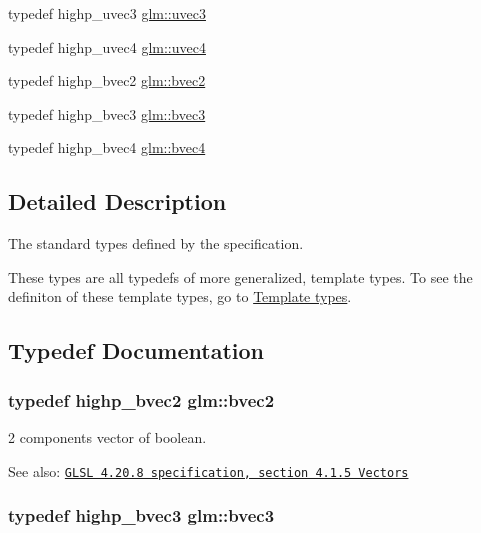 \begin{CompactItemize}
\item 
typedef highp\_\-uvec3 \hyperlink{group__core__types_gc4ba593917841b859ba1683b8b52b8fa}{glm::uvec3}
\item 
typedef highp\_\-uvec4 \hyperlink{group__core__types_g1c426d19627b32b14f0089f7f4ba7b1d}{glm::uvec4}
\item 
typedef highp\_\-bvec2 \hyperlink{group__core__types_g7523cf292181cf7daef3aa0a3267d8e3}{glm::bvec2}
\item 
typedef highp\_\-bvec3 \hyperlink{group__core__types_g3f07d6d37fc6fe875170fd5799685bcf}{glm::bvec3}
\item 
typedef highp\_\-bvec4 \hyperlink{group__core__types_g6bb211b3d3bebae3867548d5673ca5cd}{glm::bvec4}
\end{CompactItemize}


\subsection{Detailed Description}
The standard types defined by the specification. 

These types are all typedefs of more generalized, template types. To see the definiton of these template types, go to \hyperlink{group__core__template}{Template types}. 

\subsection{Typedef Documentation}
\hypertarget{group__core__types_g7523cf292181cf7daef3aa0a3267d8e3}{
\subsubsection[bvec2]{\setlength{\rightskip}{0pt plus 5cm}typedef highp\_\-bvec2 {\bf glm::bvec2}}}
\label{group__core__types_g7523cf292181cf7daef3aa0a3267d8e3}


2 components vector of boolean.

\begin{Desc}
\item[See also:]\href{http://www.opengl.org/registry/doc/GLSLangSpec.4.20.8.pdf}{\tt GLSL 4.20.8 specification, section 4.1.5 Vectors} \end{Desc}
\hypertarget{group__core__types_g3f07d6d37fc6fe875170fd5799685bcf}{
\subsubsection[bvec3]{\setlength{\rightskip}{0pt plus 5cm}typedef highp\_\-bvec3 {\bf glm::bvec3}}}
\label{group__core__types_g3f07d6d37fc6fe875170fd5799685bcf}


